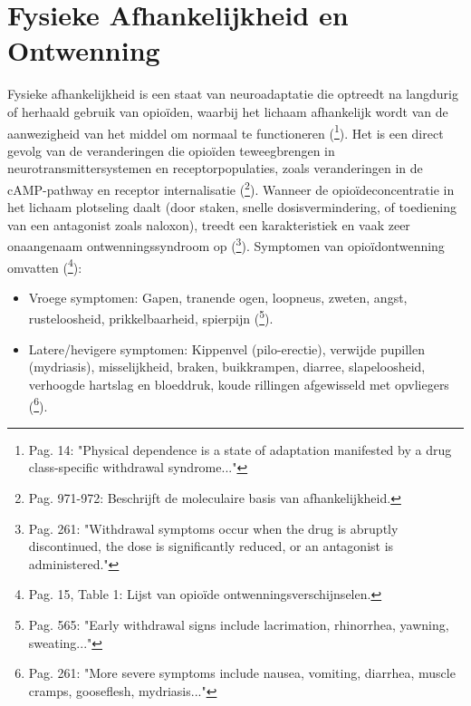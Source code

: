 \documentclass[11pt, a4paper]{report} %
\begin{document}
\section{Fysieke Afhankelijkheid en Ontwenning}
Fysieke afhankelijkheid is een staat van neuroadaptatie die optreedt na langdurig of herhaald gebruik van opioïden, waarbij het lichaam afhankelijk wordt van de aanwezigheid van het middel om normaal te functioneren (\cite{Kosten2002NeurobiologyDependence}\footnote{Pag. 14: "Physical dependence is a state of adaptation manifested by a drug class-specific withdrawal syndrome..."}). Het is een direct gevolg van de veranderingen die opioïden teweegbrengen in neurotransmittersystemen en receptorpopulaties, zoals veranderingen in de cAMP-pathway en receptor internalisatie (\cite{Shang2020MolecularBasis}\footnote{Pag. 971-972: Beschrijft de moleculaire basis van afhankelijkheid.}). Wanneer de opioïdeconcentratie in het lichaam plotseling daalt (door staken, snelle dosisvermindering, of toediening van een antagonist zoals naloxon), treedt een karakteristiek en vaak zeer onaangenaam ontwenningssyndroom op (\cite{Cicero2017Review}\footnote{Pag. 261: "Withdrawal symptoms occur when the drug is abruptly discontinued, the dose is significantly reduced, or an antagonist is administered."}). Symptomen van opioïdontwenning omvatten (\cite{Kosten2002NeurobiologyDependence}\footnote{Pag. 15, Table 1: Lijst van opioïde ontwenningsverschijnselen.}):
\begin{itemize}
    \item Vroege symptomen: Gapen, tranende ogen, loopneus, zweten, angst, rusteloosheid, prikkelbaarheid, spierpijn (\cite{GutsteinAkil2006OpioidAnalgesics}\footnote{Pag. 565: "Early withdrawal signs include lacrimation, rhinorrhea, yawning, sweating..."}).
    \item Latere/hevigere symptomen: Kippenvel (pilo-erectie), verwijde pupillen (mydriasis), misselijkheid, braken, buikkrampen, diarree, slapeloosheid, verhoogde hartslag en bloeddruk, koude rillingen afgewisseld met opvliegers (\cite{Cicero2017Review}\footnote{Pag. 261: "More severe symptoms include nausea, vomiting, diarrhea, muscle cramps, gooseflesh, mydriasis..."}).
\end{itemize}
\end{document}
